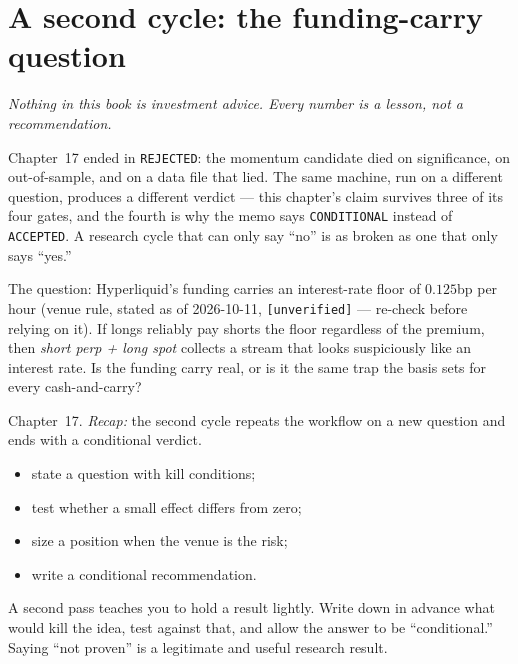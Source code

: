 \chapter{A second cycle: the funding-carry question}\label{ch:cycle2}

\noindent\emph{Nothing in this book is investment advice. Every
number is a lesson, not a recommendation.}

\medskip
\noindent Chapter~17 ended in \texttt{REJECTED}: the momentum
candidate died on significance, on out-of-sample, and on a data
file that lied. The same machine, run on a different question,
produces a different verdict --- this chapter's claim survives
three of its four gates, and the fourth is why the memo says
\texttt{CONDITIONAL} instead of \texttt{ACCEPTED}. A research
cycle that can only say ``no'' is as broken as one that only
says ``yes.''

The question: Hyperliquid's funding carries an interest-rate
floor of $0.125$bp per hour (venue rule, stated as of
2026-10-11, \texttt{[unverified]} --- re-check before relying
on it). If longs reliably pay shorts the floor regardless of
the premium, then \emph{short perp + long spot} collects a
stream that looks suspiciously like an interest rate. Is the
funding carry real, or is it the same trap the basis sets for
every cash-and-carry?

\begin{rulebox}
Chapter~17. \emph{Recap:} the second cycle repeats the workflow on a new question and ends with a conditional verdict.
\end{rulebox}
\begin{wins}
\begin{itemize}
\item state a question with kill conditions;
\item test whether a small effect differs from zero;
\item size a position when the venue is the risk;
\item write a conditional recommendation.
\end{itemize}
\end{wins}
\begin{principle}
A second pass teaches you to hold a result lightly. Write down in advance what would kill the idea, test against that, and allow the answer to be ``conditional.'' Saying ``not proven'' is a legitimate and useful research result.
\end{principle}

